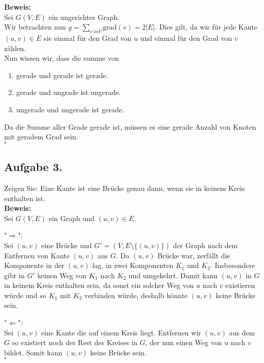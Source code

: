 \documentclass[11pt,a4paper,ngerman]{article}
\begin{document}
\textbf{Beweis:}\\

Sei $G(V,E)$ ein ungerichter Graph.\\

Wir betrachten nun $g = \underset{v\ in V}{\sum} \text{grad}(v) = 2 |E|$.
Dies gilt, da wir für jede Kante $(u,v) \in E$ sie einmal für den Grad von $u$ und einmal
für den Grad von $v$ zählen.\\

Nun wissen wir, dass die summe von
\begin{enumerate}
	\item gerade und gerade ist gerade.
	\item gerade und ungrade ist ungerade.
	\item ungerade und ungerade ist gerade.
\end{enumerate}
Da die Summe aller Grade gerade ist, müssen es eine gerade Anzahl von Knoten mit geradem Grad sein.\\

\mbox{}\hfill$\square$

\subsection*{Aufgabe 3.}

Zeigen Sie: Eine Kante ist eine Brücke genau dann, wenn sie in keinem Kreis enthalten ist.\\

\textbf{Beweis:}\\
Sei $G(V,E)$ ein Graph und $(u,v) \in E$.

"$\Rightarrow$":\\
Sei $(u,v)$ eine Brücke und $G' = (V,E \setminus \{ (u,v) \})$ der Graph nach dem Entfernen von Kante $(u,v)$ aus $G$.
Da $(u,v)$ Brücke war, zerfällt die Komponente in der $(u,v)$ lag, in zwei Komponenten $K_1$ und $K_2$.
Insbesondere gibt in $G'$ keinen Weg von $K_1$ nach $K_2$ und umgekehrt. Damit kann $(u,v)$ in $G$ in
keinem Kreis enthalten sein, da sonst ein solcher Weg von $u$ nach $v$ existieren würde
und so $K_1$ mit $K_2$ verbinden würde, deshalb könnte $(u,v)$ keine Brücke sein.

"$\Leftarrow$":\\
Sei $(u,v)$ eine Kante die auf einem Kreis liegt.
Entfernen wir $(u,v)$ aus dem $G$ so existiert noch der Rest des Kreises in $G$, der nun einen Weg von
$u$ nach $v$ bildet. Somit kann $(u,v)$ keine Brücke sein.\\
\mbox{}\hfill$\square$
\end{document}
